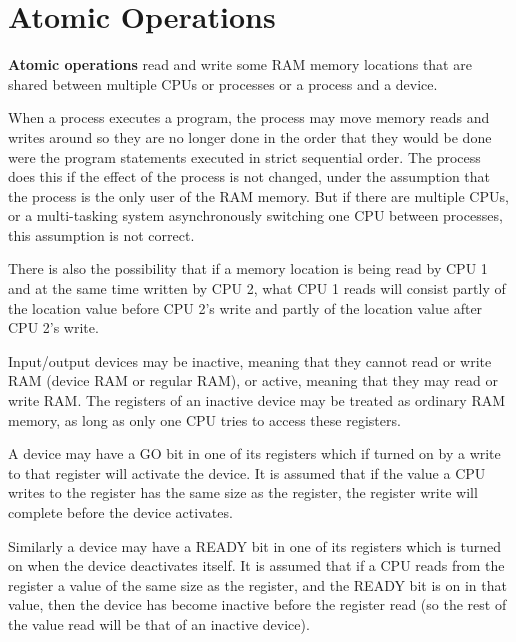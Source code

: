 \documentclass[12pt]{article}
\newcommand{\key}[1]{{\rm \bfseries #1}}
\begin{document}
\section{Atomic Operations}
\label{ATOMIC-OPERATIONS}

\key{Atomic operations} read and write some RAM memory locations
that are shared between multiple CPUs or processes or a process and a device.

When a process executes a program, the process may move
memory reads and writes around so they are no longer
done in the order that they would be done were the program
statements executed in strict sequential order.  The
process does this if the effect of the process is not
changed, under the assumption that the process is the
only user of the RAM memory.  But if there are multiple CPUs,
or a multi-tasking system asynchronously switching one CPU
between processes, this assumption is not correct.

There is also the possibility that if a memory location is
being read by CPU 1 and at the same time written by CPU 2,
what CPU 1 reads will consist partly of the location value
before CPU 2's write and partly of the location value after
CPU 2's write.

Input/output devices may be
inactive, meaning that they cannot read or write RAM (device RAM or regular
RAM), or active, meaning that they may read or write RAM. 
The registers of an inactive device may be treated as ordinary RAM memory,
as long as only one CPU tries to access these registers.

A device may have a GO bit in one of its registers which if turned on
by a write to that register will activate the device.  It is assumed
that if the value a CPU writes to the register has the same size as the
register, the register write will complete before the device activates.

Similarly a device may have a READY bit in one of its registers which
is turned on when the device deactivates itself.  It is assumed that
if a CPU reads from the register a value of the same size as the register,
and the READY bit is on in that value, then the device has become inactive
before the register read (so the rest of the value read will be that of
an inactive device).
\end{document}
